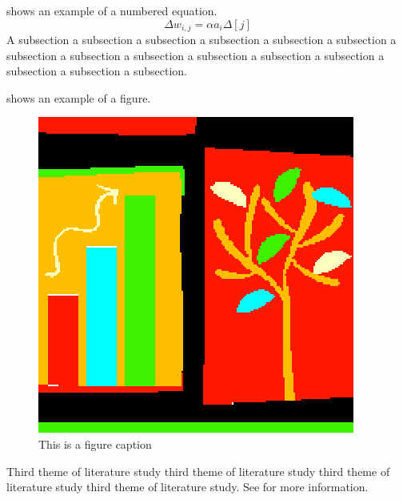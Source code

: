 
 shows an example of a numbered equation.
\begin{equation}
  \Delta w_{i,j} = \alpha a_i \Delta[j]  \label{eqn:example}
\end{equation}
A subsection a subsection a subsection a subsection a subsection a
subsection a subsection a subsection a subsection a subsection a
subsection a subsection a subsection a subsection a subsection.
\nocite{dellaert_spieits_1997}

 shows an example of a figure.
\begin{figure}[!ht]
  \centering
  \includegraphics[width=0.4\linewidth]{figures/figure1}
  \caption{This is a figure caption}
  \label{fig:example}
\end{figure}

Third theme of literature study third theme of literature study third
theme of literature study third theme of literature study. See
 for more information.
